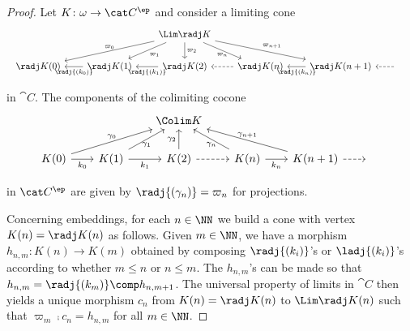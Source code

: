 \begin{proof}
Let
$K \colon \omega \to \cat C^\ep$
and consider a limiting cone
\begin{equation}
\label{diag:proof:scott:lim}
\begin{array}{c}
\begin{tikzcd}[column sep=2em] %
&
& \Lim \radj K
  \arrow{dll}[above]{\varpi_0}
  \arrow{dl}{\varpi_1}
  \arrow{d}{\varpi_2}
  \arrow{dr}[below]{\varpi_n}
  \arrow{drr}{\varpi_{n+1}}

\\

  \radj K(0)
& \radj K(1)
  \arrow{l}[below]{\radj{(k_0)}}
& \radj K(2)
  \arrow{l}[below]{\radj{(k_1)}}
& \radj K(n)
  \arrow[dashed]{l}
& \radj K(n+1)
  \arrow{l}[below]{\radj{(k_n)}}
& \phantom{F}
  \arrow[dashed]{l}
\end{tikzcd}
\end{array}
\end{equation}


\noindent
in $\cat C$.
The components of the colimiting cocone
\begin{equation}
\label{diag:proof:scott:colim}
\begin{array}{c}
\begin{tikzcd}[column sep=2em]
&
& \Colim K

\\

  K(0)
  \arrow{r}[below]{k_0}
  \arrow{urr}[above]{\gamma_0}
& K(1)
  \arrow{r}[below]{k_1}
  \arrow{ur}[below]{\gamma_1}
& K(2)
  \arrow[dashed]{r}
  \arrow{u}{\gamma_2}
& K(n)
  \arrow{r}[below]{k_n}
  \arrow{ul}[below]{\gamma_n}
& K(n+1)
  \arrow[dashed]{r}
  \arrow{ull}[above]{\gamma_{n+1}}
& \phantom{F}
\end{tikzcd}
\end{array}
\end{equation}

\noindent
in $\cat C^\ep$ are given by $\radj{(\gamma_n)} = \varpi_n$
for projections.

Concerning embeddings,
for each $n \in \NN$ we build a cone with vertex $K(n) = \radj K(n)$
as follows.
Given $m \in \NN$, we have a morphism $h_{n,m} \colon K(n) \to K(m)$
obtained by composing $\radj{(k_i)}$'s or $\ladj{(k_i)}$'s
according to whether $m \leq n$ or $n \leq m$.
The $h_{n,m}$'s can be made so that $h_{n,m} = \radj{(k_m)} \comp h_{n,m+1}$.
The universal property of limits in $\cat C$ then yields
a unique morphism $c_n$ from $K(n) = \radj K(n)$ to $\Lim \radj K(n)$
such that $\varpi_m \comp c_n = h_{n,m}$ for all $m \in \NN$.


\end{proof}

